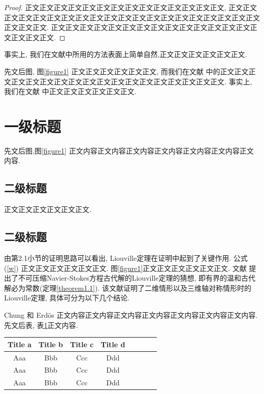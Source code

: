 \documentclass{SCIA2023cn}
\theoremstyle{mystyle}
\begin{document}
\begin{proof}
正文正文正文正文正文正文正文正文正文正文正文正文正文正文,
正文正文正文正文正文正文正文正文正文正文正文正文正文正文正文正文正文正文正文正文正文正文正文.
正文正文正文正文正文正文正文正文正文正文正文正文正文正文正文正文正文正文.
\end{proof}
事实上, 我们在文献\cite{1}中所用的方法表面上简单自然,正文正文正文正文正文正文.

先文后图, 图\ref{figure1} 正文正文正文正文正文正文, 而我们在文献\cite{1}
中的正文正文正文正文正文正文正文正文正文正文正文正文正文正文正文正文正文正文.
事实上, 我们在文献\cite{1} 中正文正文正文正文正文正文.


\section{一级标题}
先文后图,图\ref{figure1} 正文内容正文内容正文内容正文内容正文内容正文内容正文内容.

\subsection{二级标题}
正文正文正文正文正文正文.
\subsection{二级标题}
 由第2.1小节的证明思路可以看出, Liouville定理在证明中起到了关键作用. 公式(\ref{w}) 正文正文正文正文正文正文. 图\ref{figure1}正文正文正文正文正文正文.
 文献\cite{1} 提出了不可压缩Navier-Stokes方程古代解的Liouville定理的猜想, 即有界的温和古代解必为常数(定理\ref{theorem1.1}). 该文献证明了二维情形以及三维轴对称情形时的Liouville定理, 具体可分为以下几个结论.


  Chung 和 Erd\"os 正文内容正文内容正文内容正文内容正文内容正文内容正文内容.先文后表, 表\ref{tab1}正文内容.
  \begin{table}[!h]
  \centering
{}
\label{tab1}
\footnotesize
\begin{tabular}{cccccccc}
\toprule
  Title a & Title b & Title c & Title d \\   %
  \hline
  Aaa & Bbb & Ccc & Ddd\\
  Aaa & Bbb & Ccc & Ddd\\
  Aaa & Bbb & Ccc & Ddd\\
\bottomrule
\end{tabular}
\end{table}
\end{document}
